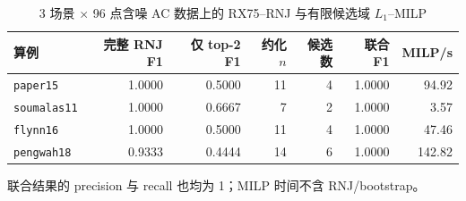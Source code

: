 \begin{table}[htbp]
\centering
\caption{3 场景 $\times$ 96 点含噪 AC 数据上的 RX75--RNJ 与有限候选域 $L_1$--MILP}
\label{tab:rx75-rnj-milp-hybrid}
\scriptsize
\begin{tabular}{lrrrrrr}
\toprule
算例 & 完整 RNJ F1 & 仅 top-2 F1 & 约化 $n$ & 候选数 & 联合 F1 & MILP/s \\
\midrule
\texttt{paper15}    & 1.0000 & 0.5000 & 11 & 4 & 1.0000 & 94.92 \\
\texttt{soumalas11} & 1.0000 & 0.6667 &  7 & 2 & 1.0000 &  3.57 \\
\texttt{flynn16}    & 1.0000 & 0.5000 & 11 & 4 & 1.0000 & 47.46 \\
\texttt{pengwah18}  & 0.9333 & 0.4444 & 14 & 6 & 1.0000 & 142.82 \\
\bottomrule
\end{tabular}
\par\smallskip
\footnotesize 联合结果的 precision 与 recall 也均为 1；MILP 时间不含 RNJ/bootstrap。
\end{table}
